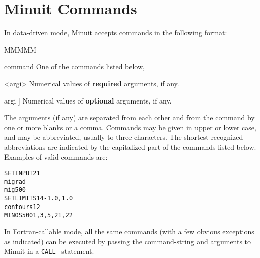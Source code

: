  
\chapter{Minuit Commands}

In data-driven mode, Minuit accepts commands in the following
format:
 
 
\begin{DLtt}{MMMMM}
\item[command] One of the commands listed below,
\item[<argi>]           Numerical values of {\bf required} arguments, if any.
\item[\lsb{}argi\rsb]]  Numerical values of {\bf optional} arguments, if any.
\end{DLtt}

The arguments (if any) are separated from each other and from the
command by one or more blanks or a comma.
Commands may be given in upper or lower case, and may be abbreviated,
usually to three characters. The shortest recognized abbreviations
are indicated by the capitalized part of the commands listed below.
Examples of valid commands are:

\begin{alltt}\footnotesize
SET INPUT  21
migrad
mig  500
SET LIMITS  14  -1.0,1.0
contours  1  2
MINOS  500  1,3,5,21,22                            
\end{alltt}
 
In Fortran-callable mode, all the same commands (with a few
obvious exceptions as indicated) can be executed by passing the
command-string and arguments to Minuit in a \texttt{CALL}~ statement.
 
